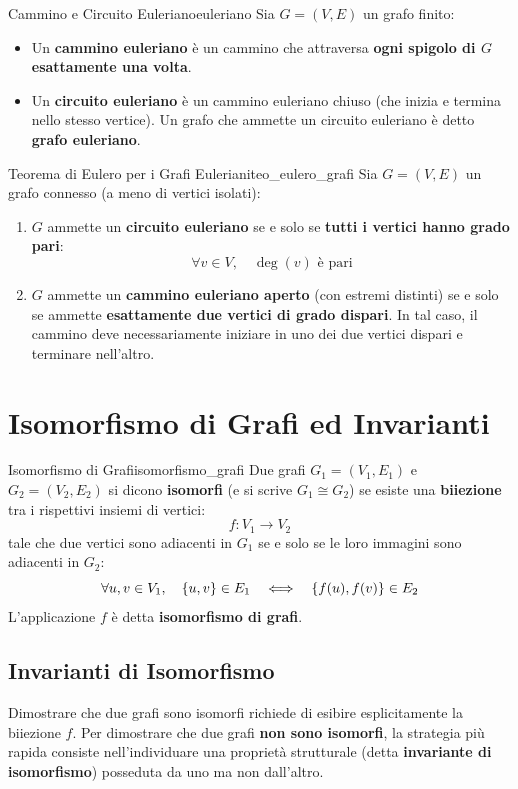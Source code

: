 \begin{definizione}{Cammino e Circuito Euleriano}{euleriano}
Sia $G = (V, E)$ un grafo finito:
\begin{itemize}
    \item Un \textbf{cammino euleriano} è un cammino che attraversa \textbf{ogni spigolo di $G$ esattamente una volta}.
    \item Un \textbf{circuito euleriano} è un cammino euleriano chiuso (che inizia e termina nello stesso vertice).
    Un grafo che ammette un circuito euleriano è detto \textbf{grafo euleriano}.
\end{itemize}
\end{definizione}

\begin{teorema}{Teorema di Eulero per i Grafi Euleriani}{teo_eulero_grafi}
Sia $G = (V, E)$ un grafo connesso (a meno di vertici isolati):
\begin{enumerate}
    \item $G$ ammette un \textbf{circuito euleriano} se e solo se \textbf{tutti i vertici hanno grado pari}:
    \[
        \forall v \in V, \quad \deg(v) \text{ è pari}
    \]
    \item $G$ ammette un \textbf{cammino euleriano aperto} (con estremi distinti) se e solo se ammette \textbf{esattamente due vertici di grado dispari}. In tal caso, il cammino deve necessariamente iniziare in uno dei due vertici dispari e terminare nell'altro.
\end{enumerate}
\end{teorema}

\section{Isomorfismo di Grafi ed Invarianti}

\begin{definizione}{Isomorfismo di Grafi}{isomorfismo_grafi}
Due grafi $G_1 = (V_1, E_1)$ e $G_2 = (V_2, E_2)$ si dicono \textbf{isomorfi} (e si scrive $G_1 \cong G_2$) se esiste una \textbf{biiezione} tra i rispettivi insiemi di vertici:
\[
    f: V_1 \longrightarrow V_2
\]
tale che due vertici sono adiacenti in $G_1$ se e solo se le loro immagini sono adiacenti in $G_2$:
\[
    \forall u, v \in V_1, \quad \{u, v\} \in E_1 \quad \Longleftrightarrow \quad \{f(u), f(v)\} \in E_2
\]
L'applicazione $f$ è detta \textbf{isomorfismo di grafi}.
\end{definizione}

\subsection{Invarianti di Isomorfismo}
Dimostrare che due grafi sono isomorfi richiede di esibire esplicitamente la biiezione $f$.
Per dimostrare che due grafi \textbf{non sono isomorfi}, la strategia più rapida consiste nell'individuare una proprietà strutturale (detta \textbf{invariante di isomorfismo}) posseduta da uno ma non dall'altro.

